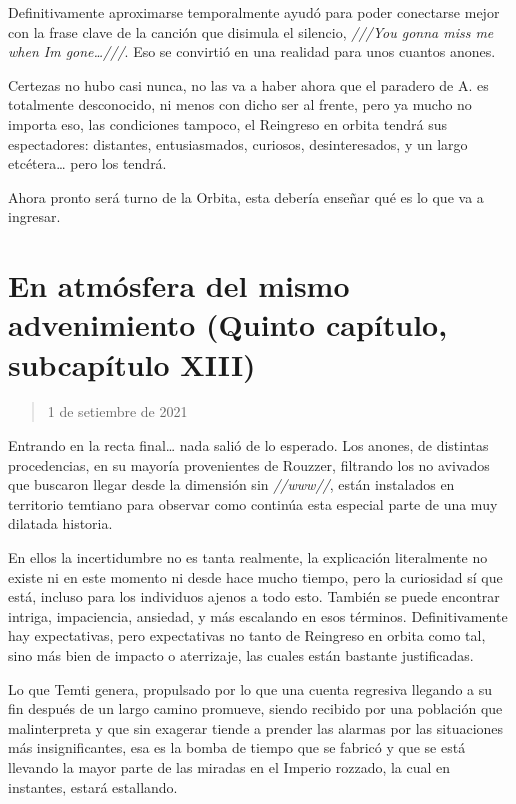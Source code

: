 \documentclass[
  spanish,
]{book}
\begin{document}
Definitivamente aproximarse temporalmente ayudó para poder conectarse mejor con la frase clave de la canción que disimula el silencio, \emph{///You gonna miss me when Im gone\ldots///}. Eso se convirtió en una realidad para unos cuantos anones.

Certezas no hubo casi nunca, no las va a haber ahora que el paradero de A. es totalmente desconocido, ni menos con dicho ser al frente, pero ya mucho no importa eso, las condiciones tampoco, el Reingreso en orbita tendrá sus espectadores: distantes, entusiasmados, curiosos, desinteresados, y un largo etcétera\ldots{} pero los tendrá.

Ahora pronto será turno de la Orbita, esta debería enseñar qué es lo que va a ingresar.

\hypertarget{en-atmuxf3sfera-del-mismo-advenimiento-quinto-capuxedtulo-subcapuxedtulo-xiii}{%
\section{En atmósfera del mismo advenimiento (Quinto capítulo, subcapítulo XIII)}\label{en-atmuxf3sfera-del-mismo-advenimiento-quinto-capuxedtulo-subcapuxedtulo-xiii}}

\begin{quote}
1 de setiembre de 2021
\end{quote}

Entrando en la recta final\ldots{} nada salió de lo esperado. Los anones, de distintas procedencias, en su mayoría provenientes de Rouzzer, filtrando los no avivados que buscaron llegar desde la dimensión sin \emph{//www//}, están instalados en territorio temtiano para observar como continúa esta especial parte de una muy dilatada historia.

En ellos la incertidumbre no es tanta realmente, la explicación literalmente no existe ni en este momento ni desde hace mucho tiempo, pero la curiosidad sí que está, incluso para los individuos ajenos a todo esto. También se puede encontrar intriga, impaciencia, ansiedad, y más escalando en esos términos. Definitivamente hay expectativas, pero expectativas no tanto de Reingreso en orbita como tal, sino más bien de impacto o aterrizaje, las cuales están bastante justificadas.

Lo que Temti genera, propulsado por lo que una cuenta regresiva llegando a su fin después de un largo camino promueve, siendo recibido por una población que malinterpreta y que sin exagerar tiende a prender las alarmas por las situaciones más insignificantes, esa es la bomba de tiempo que se fabricó y que se está llevando la mayor parte de las miradas en el Imperio rozzado, la cual en instantes, estará estallando.
\end{document}
